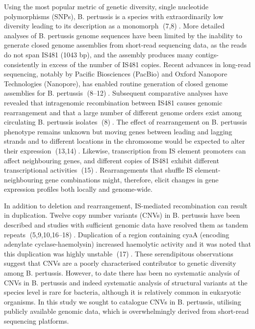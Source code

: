 \documentclass{article}
\begin{document}
Using the most popular metric of genetic diversity, single nucleotide polymorphisms (SNPs), B. pertussis is a species with extraordinarily low diversity leading to its description as a monomorph (7,8). More detailed analyses of B. pertussis genome sequences have been limited by the inability to generate closed genome assemblies from short-read sequencing data, as the reads do not span IS481 (1043 bp), and the assembly produces many contigs- consistently in excess of the number of IS481 copies. Recent advances in long-read sequencing, notably by Pacific Biosciences (PacBio) and Oxford Nanopore Technologies (Nanopore), has enabled routine generation of closed genome assemblies for B. pertussis (8–12). Subsequent comparative analyses have revealed that intragenomic recombination between IS481 causes genomic rearrangement and that a large number of different genome orders exist among circulating B. pertussis isolates (8). The effect of rearrangement on B. pertussis phenotype remains unknown but moving genes between leading and lagging strands and to different locations in the chromosome would be expected to alter their expression (13,14). Likewise, transcription from IS element promoters can affect neighbouring genes, and different copies of IS481 exhibit different transcriptional activities (15). Rearrangements that shuffle IS element-neighbouring gene combinations might, therefore, elicit changes in gene expression profiles both locally and genome-wide.

In addition to deletion and rearrangement, IS-mediated recombination can result in duplication. Twelve copy number variants (CNVs) in B. pertussis have been described and studies with sufficient genomic data have resolved them as tandem repeats (5,9,10,16–18). Duplication of a region containing cyaA (encoding adenylate cyclase-haemolysin) increased haemolytic activity and it was noted that this duplication was highly unstable (17). These serendipitous observations suggest that CNVs are a poorly characterised contributor to genetic diversity among B. pertussis. However, to date there has been no systematic analysis of CNVs in B. pertussis and indeed systematic analysis of structural variants at the species level is rare for bacteria, although it is relatively common in eukaryotic organisms. In this study we sought to catalogue CNVs in B. pertussis, utilising publicly available genomic data, which is overwhelmingly derived from short-read sequencing platforms. 
\end{document}
